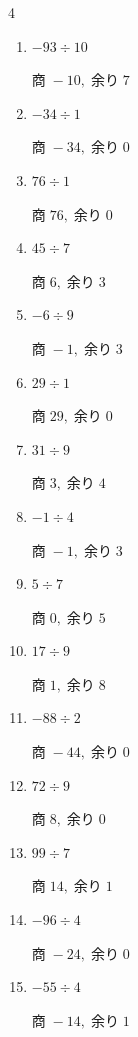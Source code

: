 \begin{multicols}{4}
\begin{enumerate}
        $商\; -5,\; 余り\; 2$

  \item $-93 \div 10$

        $商\; -10,\; 余り\; 7$

  \item $-34 \div 1$

        $商\; -34,\; 余り\; 0$

  \item $76 \div 1$

        $商\; 76,\; 余り\; 0$

  \item $45 \div 7$

        $商\; 6,\; 余り\; 3$

  \item $-6 \div 9$

        $商\; -1,\; 余り\; 3$

  \item $29 \div 1$

        $商\; 29,\; 余り\; 0$

  \item $31 \div 9$

        $商\; 3,\; 余り\; 4$

  \item $-1 \div 4$

        $商\; -1,\; 余り\; 3$

  \item $5 \div 7$

        $商\; 0,\; 余り\; 5$

  \item $17 \div 9$

        $商\; 1,\; 余り\; 8$

  \item $-88 \div 2$

        $商\; -44,\; 余り\; 0$

  \item $72 \div 9$

        $商\; 8,\; 余り\; 0$

  \item $99 \div 7$

        $商\; 14,\; 余り\; 1$

  \item $-96 \div 4$

        $商\; -24,\; 余り\; 0$

  \item $-55 \div 4$

        $商\; -14,\; 余り\; 1$


\end{enumerate}
\end{multicols}
